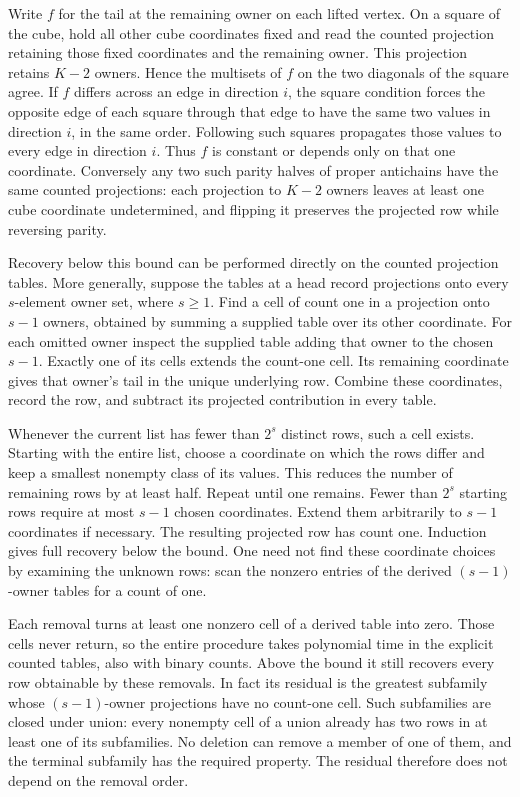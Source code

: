 Write $f$ for the tail at the remaining owner on
each lifted vertex. On a square of the cube, hold
all other cube coordinates fixed and read the
counted projection retaining those fixed coordinates
and the remaining owner. This projection retains
$K-2$ owners. Hence the multisets of $f$ on the
two diagonals of the square agree. If $f$ differs
across an edge in direction $i$, the square
condition forces the opposite edge of each square
through that edge to have the same two values in
direction $i$, in the same order. Following such
squares propagates those values to every edge in
direction $i$. Thus $f$ is constant or depends
only on that one coordinate. Conversely any two
such parity halves of proper antichains have the
same counted projections: each projection to
$K-2$ owners leaves at least one cube coordinate
undetermined, and flipping it preserves the
projected row while reversing parity.

Recovery below this bound can be performed directly
on the counted projection tables. More generally,
suppose the tables at a head record projections
onto every $s$-element owner set, where $s\ge1$.
Find a cell of count one in a projection onto
$s-1$ owners, obtained by summing a supplied table
over its other coordinate. For each omitted owner
inspect the supplied table adding that owner to
the chosen $s-1$. Exactly one of its cells extends
the count-one cell. Its remaining coordinate gives
that owner's tail in the unique underlying row.
Combine these coordinates, record the row, and
subtract its projected contribution in every
table.

Whenever the current list has fewer than $2^s$
distinct rows, such a cell exists. Starting with
the entire list, choose a coordinate on which the
rows differ and keep a smallest nonempty class of
its values. This reduces the number of remaining
rows by at least half. Repeat until one remains.
Fewer than $2^s$ starting rows require at most
$s-1$ chosen coordinates. Extend them arbitrarily
to $s-1$ coordinates if necessary. The resulting
projected row has count one. Induction gives full
recovery below the bound. One need not find these
coordinate choices by examining the unknown rows:
scan the nonzero entries of the derived
$(s-1)$-owner tables for a count of one.

Each removal turns at least one nonzero cell of a
derived table into zero. Those cells never return,
so the entire procedure takes polynomial time in
the explicit counted tables, also with binary
counts. Above the bound it still recovers every
row obtainable by these removals. In fact its
residual is the greatest subfamily whose
$(s-1)$-owner projections have no count-one cell.
Such subfamilies are closed under union: every
nonempty cell of a union already has two rows in at
least one of its subfamilies. No deletion can
remove a member of one of them, and the terminal
subfamily has the required property. The residual
therefore does not depend on the removal order.

